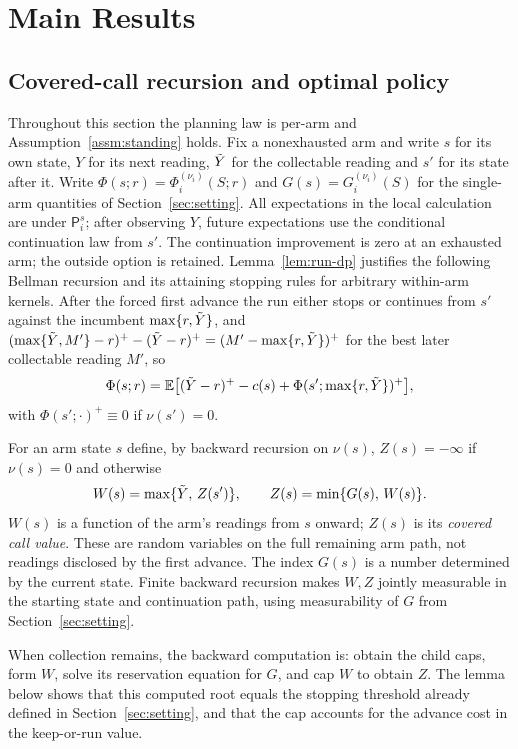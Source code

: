 \section{Main Results}
\label{sec:main}

\subsection{Covered-call recursion and optimal policy}
\label{sec:nested}

Throughout this section the planning law is per-arm and
Assumption~\ref{assm:standing} holds. Fix a nonexhausted arm and write $s$ for its own state, $Y$ for its
next reading, $\tilde Y$ for the collectable reading and $s'$ for its state after it. Write $\Phi(s;r)=\Phi_i^{(\nu_i)}(S;r)$ and $G(s)=G_i^{(\nu_i)}(S)$ for the single-arm quantities of Section~\ref{sec:setting}.
All expectations in the local calculation are under $\mathsf P_i^s$; after observing $Y$,
future expectations use the conditional continuation law from $s'$. The continuation
improvement is zero at an exhausted arm; the outside option is retained.
Lemma~\ref{lem:run-dp} justifies the following Bellman
recursion and its attaining stopping rules for arbitrary within-arm kernels.
After the forced first advance the run
either stops or continues from $s'$ against the incumbent $\max\{r,\tilde Y\}$, and
$(\max\{\tilde Y,M'\}-r)^+-(\tilde Y-r)^+=(M'-\max\{r,\tilde Y\})^+$ for the best later collectable reading
$M'$, so
\begin{equation}
\Phi(s;r)=\mathbb{E}\bigl[(\tilde Y-r)^+-c(s)+\Phi(s';\max\{r,\tilde Y\})^+\bigr],
\label{eq:phi-bellman}
\end{equation}
with $\Phi(s';\cdot)^+\equiv0$ if $\nu(s')=0$.

\begin{definition}\label{def:nested}
For an arm state $s$ define, by backward recursion on $\nu(s)$, $Z(s)=-\infty$ if $\nu(s)=0$ and
otherwise
\[
W(s)=\max\{\tilde Y,\,Z(s')\},\qquad Z(s)=\min\{G(s),\,W(s)\}.
\]
$W(s)$ is a function of the arm's readings from $s$ onward; $Z(s)$ is its \emph{covered call value}.
These are random variables on the full remaining arm path, not readings disclosed by the
first advance. The index $G(s)$ is a number determined by the current state.
Finite backward recursion makes $W,Z$ jointly measurable in the starting state and continuation
path, using measurability of $G$ from Section~\ref{sec:setting}.
\end{definition}

When collection remains, the backward computation is: obtain the child caps,
form $W$, solve its reservation equation for $G$, and cap $W$ to obtain $Z$.
The lemma below shows that this computed root equals the stopping threshold
already defined in Section~\ref{sec:setting}, and that the cap accounts for
the advance cost in the keep-or-run value.

